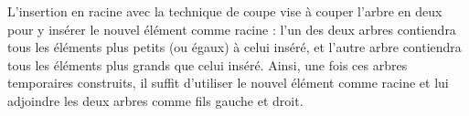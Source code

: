 \documentclass[11pt,a4paper]{article}
\begin{document}
L'insertion en racine avec la technique de coupe vise à couper l'arbre en deux pour y insérer le nouvel élément comme racine : l'un des deux arbres contiendra tous les éléments plus petits (ou égaux) à celui inséré, et l'autre arbre contiendra tous les éléments plus grands que celui inséré.
Ainsi, une fois ces arbres temporaires construits, il suffit d'utiliser le nouvel élément comme racine et lui adjoindre les deux arbres comme fils gauche et droit.


\medskip
\end{document}
